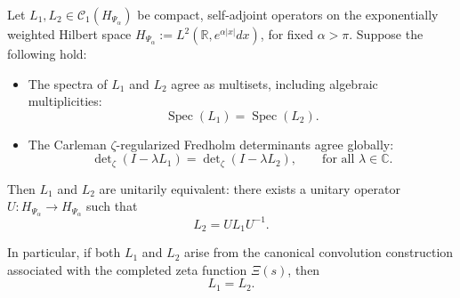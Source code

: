 \begin{proposition}
\label{prop:inverse_spectral_rigidity}
Let \( L_1, L_2 \in \mathcal{C}_1(H_{\Psi_\alpha}) \) be compact, self-adjoint operators on the exponentially weighted Hilbert space \( H_{\Psi_\alpha} := L^2(\mathbb{R}, e^{\alpha |x|} dx) \), for fixed \( \alpha > \pi \). Suppose the following hold:
\begin{itemize}
  \item The spectra of \( L_1 \) and \( L_2 \) agree as multisets, including algebraic multiplicities:
  \[
  \operatorname{Spec}(L_1) = \operatorname{Spec}(L_2).
  \]

  \item The Carleman \(\zeta\)-regularized Fredholm determinants agree globally:
  \[
  \det\nolimits_\zeta(I - \lambda L_1) = \det\nolimits_\zeta(I - \lambda L_2), \qquad \text{for all } \lambda \in \mathbb{C}.
  \]
\end{itemize}

Then \( L_1 \) and \( L_2 \) are unitarily equivalent: there exists a unitary operator \( U : H_{\Psi_\alpha} \to H_{\Psi_\alpha} \) such that
\[
L_2 = U L_1 U^{-1}.
\]

\medskip
\noindent
In particular, if both \( L_1 \) and \( L_2 \) arise from the canonical convolution construction associated with the completed zeta function \( \Xi(s) \), then
\[
L_1 = L_2.
\]
\end{proposition}

